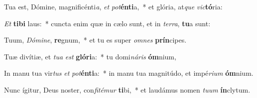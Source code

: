 \item Tua est, Dómine, magnificénti\textit{a}, \textit{et} \textit{pot}\textbf{én}\textbf{ti}a,~* et glória, at\textit{que} \textit{vic}\textbf{tó}ria:
\item \textit{Et} \textbf{ti}\textbf{bi} laus:~* cuncta enim quæ in cælo sunt, et in \textit{ter}\textit{ra}, \textbf{tu}a sunt:
\item Tuum, \textit{Dó}\textit{mi}\textit{ne}, \textbf{re}gnum,~* et tu es super \textit{om}\textit{nes} \textbf{prín}cipes.
\item Tuæ divítiæ, et \textit{tu}\textit{a} \textit{est} \textbf{gló}\textbf{ri}a:~* tu domi\textit{ná}\textit{ris} \textbf{óm}nium,
\item In manu tua vir\textit{tus} \textit{et} \textit{pot}\textbf{én}\textbf{ti}a:~* in manu tua magnitúdo, et impé\textit{ri}\textit{um} \textbf{óm}nium.
\item Nunc ígitur, Deus noster, con\textit{fi}\textit{té}\textit{mur} \textbf{ti}bi,~* et laudámus nomen \textit{tu}\textit{um} \textbf{ín}clytum.
